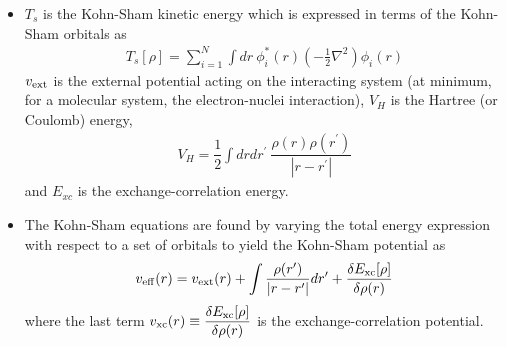 \documentclass[slidestop,mathserif,compress,xcolor=svgnames]{beamer}
\begin{document}
\begin{frame}
\footnotesize{
\begin{columns}
\column{12cm}
\begin{itemize}
\item $T_s$ is the Kohn-Sham kinetic energy which is expressed in terms of the Kohn-Sham orbitals as
\begin{align*}
T_s[\rho]=\sum_{i=1}^N\int dr\ \phi_i^*(r)\left(-\frac{1}{2}\nabla^2\right)\phi_i(r)
\end{align*}
$v_{\rm ext}$ is the external potential acting on the interacting system (at minimum, for a molecular system, the electron-nuclei interaction), $V_H$ is the Hartree (or Coulomb) energy,
\begin{align*}
 V_{H}=\dfrac{1}{2}\int drdr^\prime\  \dfrac{\rho(r)\rho(r^\prime)}{|r-r^\prime|}
\end{align*}
and $E_{xc}$ is the exchange-correlation energy. 
\item The Kohn-Sham equations are found by varying the total energy expression with respect to a set of orbitals to yield the Kohn-Sham potential as
\begin{align*}
v_{\rm eff}(r) = v_{\rm ext}(r) + \int \dfrac{\rho(r^\prime)}{|r-r^\prime|}dr^\prime + \dfrac{\delta E_{\rm xc}[\rho]}{\delta\rho(r)}
\end{align*}
where the last term $\displaystyle{v_{\rm xc}(r)\equiv\dfrac{\delta E_{\rm xc}[\rho]}{\delta\rho(r)}}$ is the exchange-correlation potential. 
\end{itemize}
\end{columns}
}
\end{frame}
\end{document}
